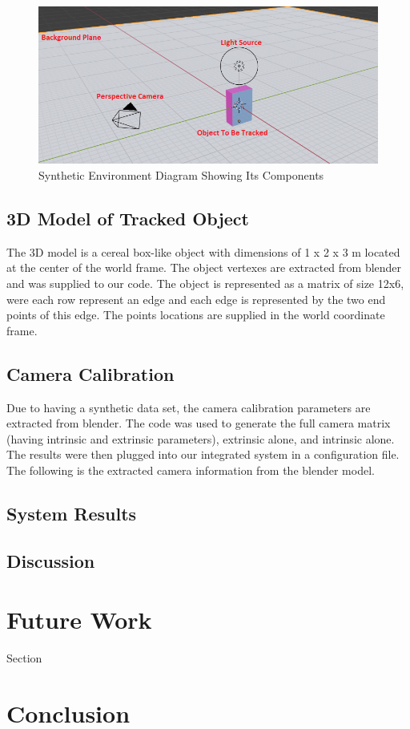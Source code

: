 \documentclass{article}
\begin{document}
\begin{figure}[H]
\centering
\includegraphics[width=\textwidth]{env_model.png}
\caption{Synthetic Environment Diagram Showing Its Components}
\end{figure}

\subsection{3D Model of Tracked Object}
The 3D model is a cereal box-like object with dimensions of 1 x 2 x 3 m located at the center of the world frame. The object vertexes are extracted from blender and was supplied to our code. The object is represented as a matrix of size 12x6, were each row represent an edge and each edge is represented by the two end points of this edge. The points locations are supplied in the world coordinate frame.  


\subsection{Camera Calibration}
Due to having a synthetic data set, the camera calibration parameters are extracted from blender. The code was used to generate the full camera matrix (having intrinsic and extrinsic parameters), extrinsic alone, and intrinsic alone. The results were then plugged into our integrated system in a configuration file. The following is the extracted camera information from the blender model.


\subsection{System Results}
\subsection{Discussion}
\section{Future Work}
Section
\section*{Conclusion}
\newpage
{}


 
\end{document}
